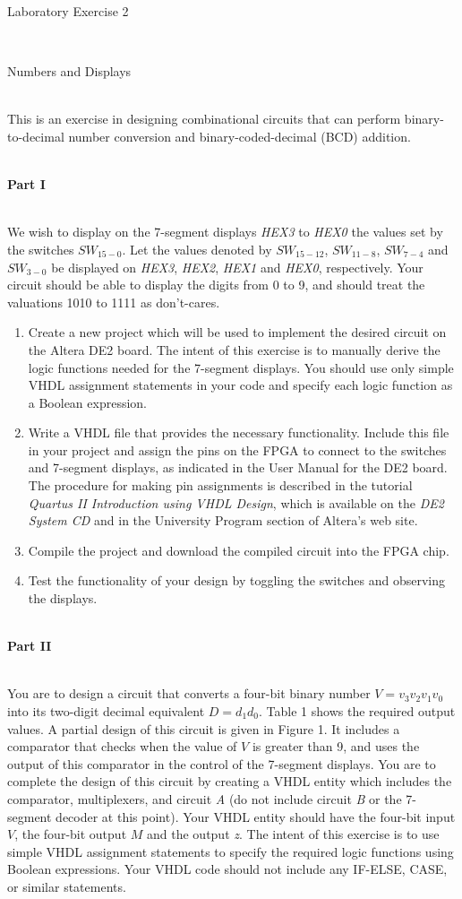 \documentclass[psfig,10pt,fullpage]{article}
\begin{document}
\centerline{\huge Laboratory Exercise 2}
~\\
\centerline{\large Numbers and Displays}
~\\

This is an exercise in designing combinational circuits that can perform
binary-to-decimal number conversion and binary-coded-decimal (BCD) addition.

~\\
\noindent
{\bf Part I}

~\\
\noindent
We wish to display on the 7-segment displays {\it HEX3} to {\it HEX0} the 
values set by the switches $SW_{15-0}$. 
Let the values denoted by $SW_{15-12}$, $SW_{11-8}$, $SW_{7-4}$ and 
$SW_{3-0}$ be displayed on {\it HEX3}, {\it HEX2}, {\it HEX1} and {\it HEX0}, respectively.
Your circuit should be able to display the digits from 0 to 9, and should treat the
valuations 1010 to 1111 as don't-cares.
\begin{enumerate}
\item Create a new project which will be used to implement the desired
circuit on the Altera DE2 board. The intent of this exercise is to manually 
derive the logic functions needed for the 7-segment displays. You should use only
simple VHDL assignment statements in your code and specify each logic function as
a Boolean expression.
\item Write a VHDL file that provides the necessary functionality. Include this 
file in your project and assign the pins on the FPGA to connect to the 
switches and 7-segment displays, as indicated in the User Manual for the DE2 board.
The procedure for making pin assignments is described in the 
tutorial {\it Quartus II Introduction using VHDL Design}, which is available 
on the {\it DE2 System CD} and in the University Program section of Altera's web site.  
\item Compile the project and download the compiled circuit into the FPGA
chip.
\item Test the functionality of your design by toggling the switches
and observing the displays.
\end{enumerate}

~\\
\noindent
{\bf Part II}

~\\
You are to design a circuit that converts a four-bit binary number $V = v_3 v_2 v_1 v_0$
into its two-digit decimal equivalent $D = d_1 d_0$. Table 1 shows the required output
values. A partial design of this circuit is given in Figure 1. It includes a comparator
that checks when the value of $V$ is greater than 9, and uses the output of this
comparator in the control of the 7-segment displays. You are to complete the design of
this circuit by creating a VHDL entity which includes the comparator, multiplexers,
and circuit {\it A} (do not include circuit {\it B} or the 7-segment decoder at this
point). Your VHDL entity should have the four-bit input $V$, the four-bit output $M$ and
the output {\it z}. The intent of this exercise is to use simple VHDL assignment
statements to specify the required logic functions using Boolean
expressions. Your VHDL code should not include any IF-ELSE, CASE, or
similar statements. 
\end{document}
